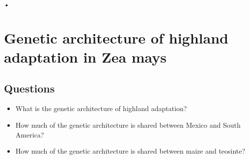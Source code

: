 
\begin{center}
\end{center}•
%
%

\section{Genetic architecture of highland adaptation in Zea mays}

\subsection{Questions}
\begin{itemize}
\item What is the genetic architecture of highland adaptation?
\item How much of the genetic architecture is shared between Mexico and South America?
\item  How much of the genetic architecture is shared between maize and teosinte?
\end{itemize}

